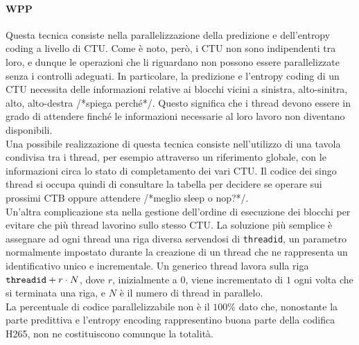 \paragraph*{WPP} Questa tecnica consiste nella parallelizzazione della 
predizione e 
dell'entropy coding a livello di CTU. Come è noto, però, i CTU non sono 
indipendenti tra loro, e dunque le operazioni che li riguardano non possono 
essere parallelizzate senza i controlli adeguati. In particolare, la predizione 
e l'entropy coding di un CTU necessita delle informazioni relative ai blocchi 
vicini a sinistra, alto-sinitra, alto, alto-destra /*spiega perché*/. Questo 
significa che i thread devono essere in grado di attendere finché le 
informazioni necessarie al loro lavoro non diventano disponibili. \\
Una possibile realizzazione di questa tecnica consiste nell'utilizzo di una 
tavola condivisa tra i thread, per esempio attraverso un riferimento globale, 
con le informazioni circa lo stato di completamento dei vari CTU. Il codice dei 
singo thread si occupa quindi di consultare la tabella per decidere se operare 
sui prossimi CTB oppure attendere /*meglio sleep o nop?*/.\\
Un'altra complicazione sta nella gestione dell'ordine di esecuzione dei blocchi 
per evitare che più thread lavorino sullo stesso CTU. La soluzione più semplice 
è assegnare ad ogni thread una riga diversa servendosi di \verb|threadid|, un 
parametro normalmente impostato durante la creazione di un thread che ne 
rappresenta un identificativo unico e incrementale. Un generico thread lavora 
sulla riga $\verb|threadid| + r \cdot N$, dove $r$, inizialmente a $0$, viene 
incrementato di $1$ ogni volta che si terminata una riga, e $N$ è il numero di 
thread in parallelo.  \\
La percentuale di codice parallelizzabile non è il $100\%$ dato che, nonostante 
la parte predittiva e l'entropy encoding rappresentino buona parte della 
codifica H265, non ne costituiscono comunque la totalità.

